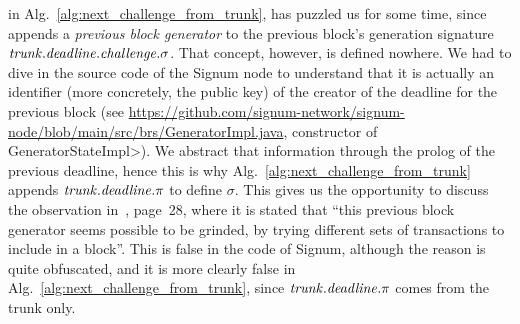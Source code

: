 in Alg.~\ref{alg:next_challenge_from_trunk},
has puzzled us for some time, since~\cite{SignumPlotting} appends a \emph{previous block generator}
to the previous block's generation signature ${\mathit{trunk}}.{\mathit{deadline}}.{\mathit{challenge}}.\sigma$.
That concept, however, is defined nowhere.
We had to dive in the source code of the Signum node to understand that it is actually
an identifier (more concretely, the public key)
of the creator of the deadline for the previous block
(see \url{https://github.com/signum-network/signum-node/blob/main/src/brs/GeneratorImpl.java}, constructor of \<GeneratorStateImpl>).
We abstract that information through the prolog of the previous deadline, hence this is why
Alg.~\ref{alg:next_challenge_from_trunk} appends
${\mathit{trunk}}.{\mathit{deadline}}.\pi$ to define $\sigma$.
This gives us the opportunity to discuss the observation in~\cite{ParkPAFG15}, page~28,
where it is stated that ``this previous block generator seems possible to be grinded, by trying
different sets of transactions to include in a block''. This is false in the code of Signum,
although the reason is quite obfuscated, and it is more clearly false in
Alg.~\ref{alg:next_challenge_from_trunk}, since ${\mathit{trunk}}.{\mathit{deadline}}.\pi$ comes
from the trunk only.
